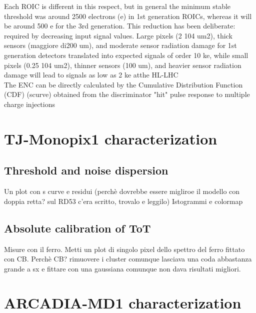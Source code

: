 Each ROIC is different in this respect, but in general the minimum stable threshold was around 2500 electrons (e) in 1st generation ROICs, whereas it will be around 500 e for the 3rd generation. This reduction has been deliberate: required by decreasing input signal values. Large pixels (2  104 um2), thick sensors (maggiore di200 um), and moderate sensor radiation damage for 1st generation detectors translated into expected signals of order 10 ke, while small pixels (0.25  104 um2), thinner sensors (100 um), and heavier sensor radiation damage will lead to signals as low as 2 ke atthe HL-LHC\\
The ENC can be directly calculated by the Cumulative Distribution Function (CDF) (scurve) obtained from the discriminator "hit" pulse response to multiple charge injections


\section{TJ-Monopix1 characterization}


    \subsection{Threshold and noise dispersion}
    Un plot con s curve e residui (perchè dovrebbe essere migliroe il modello con doppia retta? sul RD53 c'era scritto, trovalo e leggilo)
    Istogrammi e colormap\\
    
    \subsection{Absolute calibration of ToT}
    Misure con il ferro. Metti un plot di singolo pixel dello spettro del ferro fittato con CB. Perchè CB? rimuovere i cluster comunque lasciava una coda abbastanza grande a sx e fittare con una gaussiana comunque non dava risultati migliori. 
    



\section{ARCADIA-MD1 characterization}
